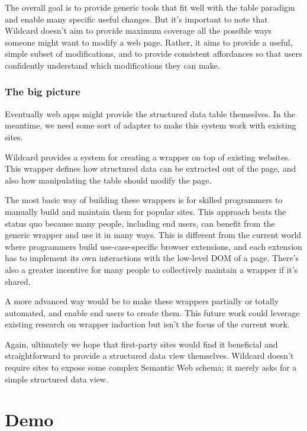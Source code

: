 \documentclass[english,submission]{programming}
\begin{document}
The overall goal is to provide generic tools that fit well with the
table paradigm and enable many specific useful changes. But it's
important to note that Wildcard doesn't aim to provide maximum coverage
all the possible ways someone might want to modify a web page. Rather,
it aims to provide a useful, simple subset of modifications, and to
provide consistent affordances so that users confidently understand
which modifications they can make.

\hypertarget{the-big-picture}{%
\subsubsection{The big picture}\label{the-big-picture}}

Eventually web apps might provide the structured data table themselves.
In the meantime, we need some sort of adapter to make this system work
with existing sites.

Wildcard provides a system for creating a wrapper on top of existing
websites. This wrapper defines how structured data can be extracted out
of the page, and also how manipulating the table should modify the page.

The most basic way of building these wrappers is for skilled programmers
to manually build and maintain them for popular sites. This approach
beats the status quo because many people, including end users, can
benefit from the generic wrapper and use it in many ways. This is
different from the current world where programmers build
use-case-specific browser extensions, and each extension has to
implement its own interactions with the low-level DOM of a page. There's
also a greater incentive for many people to collectively maintain a
wrapper if it's shared.

A more advanced way would be to make these wrappers partially or totally
automated, and enable end users to create them. This future work could
leverage existing research on wrapper induction but isn't the focus of
the current work.

Again, ultimately we hope that first-party sites would find it
beneficial and straightforward to provide a structured data view
themselves. Wildcard doesn't require sites to expose some complex
Semantic Web schema; it merely asks for a simple structured data view.

\hypertarget{demo}{%
\section{Demo}\label{demo}}
\end{document}
